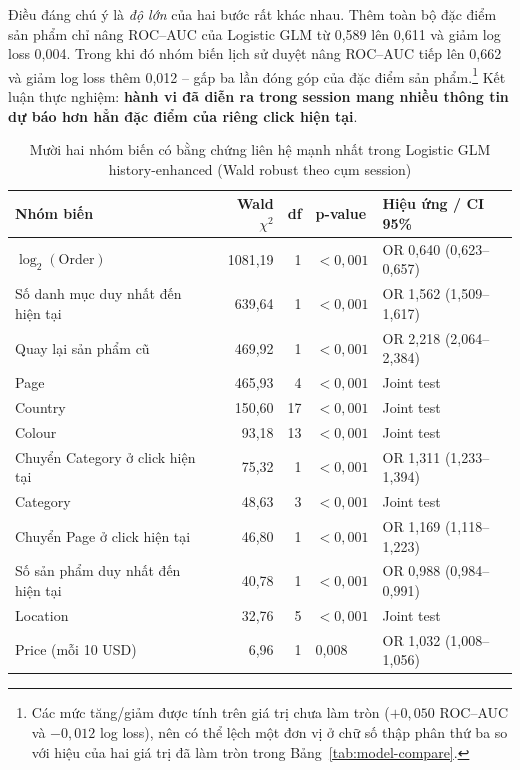 Điều đáng chú ý là \emph{độ lớn} của hai bước rất khác nhau. Thêm toàn bộ đặc
điểm sản phẩm chỉ nâng ROC--AUC của Logistic GLM từ 0,589 lên 0,611 và giảm log
loss 0,004. Trong khi đó nhóm biến lịch sử duyệt nâng ROC--AUC tiếp lên 0,662 và
giảm log loss thêm 0,012 -- gấp ba lần đóng góp của đặc điểm sản phẩm.\footnote{%
Các mức tăng/giảm được tính trên giá trị chưa làm tròn ($+0{,}050$ ROC--AUC và
$-0{,}012$ log loss), nên có thể lệch một đơn vị ở chữ số thập phân thứ ba so với
hiệu của hai giá trị đã làm tròn trong Bảng~\ref{tab:model-compare}.}
Kết luận thực nghiệm: \textbf{hành vi đã diễn ra trong session mang nhiều thông
tin dự báo hơn hẳn đặc điểm của riêng click hiện tại}.

\begin{table}[H]
\centering
\caption{Mười hai nhóm biến có bằng chứng liên hệ mạnh nhất trong Logistic GLM
history-enhanced (Wald robust theo cụm session)}
\label{tab:terms}
\small
\begin{tabular}{lrrll}
\toprule
\textbf{Nhóm biến} & \textbf{Wald $\chi^2$} & \textbf{df} & \textbf{p-value}
& \textbf{Hiệu ứng / CI 95\%} \\
\midrule
$\log_2(\text{Order})$              & 1081,19 & 1  & $< 0{,}001$ & OR 0,640 (0,623--0,657) \\
Số danh mục duy nhất đến hiện tại   & 639,64  & 1  & $< 0{,}001$ & OR 1,562 (1,509--1,617) \\
Quay lại sản phẩm cũ                & 469,92  & 1  & $< 0{,}001$ & OR 2,218 (2,064--2,384) \\
Page                                & 465,93  & 4  & $< 0{,}001$ & Joint test \\
Country                             & 150,60  & 17 & $< 0{,}001$ & Joint test \\
Colour                              & 93,18   & 13 & $< 0{,}001$ & Joint test \\
Chuyển Category ở click hiện tại    & 75,32   & 1  & $< 0{,}001$ & OR 1,311 (1,233--1,394) \\
Category                            & 48,63   & 3  & $< 0{,}001$ & Joint test \\
Chuyển Page ở click hiện tại        & 46,80   & 1  & $< 0{,}001$ & OR 1,169 (1,118--1,223) \\
Số sản phẩm duy nhất đến hiện tại   & 40,78   & 1  & $< 0{,}001$ & OR 0,988 (0,984--0,991) \\
Location                            & 32,76   & 5  & $< 0{,}001$ & Joint test \\
Price (mỗi 10 USD)                  & 6,96    & 1  & 0,008       & OR 1,032 (1,008--1,056) \\
\bottomrule
\end{tabular}
\end{table}

